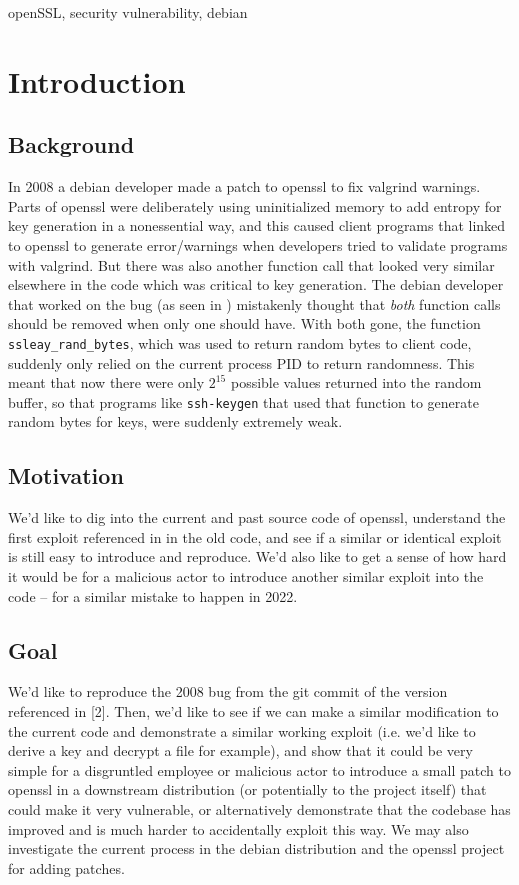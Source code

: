 \documentclass[conference]{IEEEtran}
\begin{document}
\begin{IEEEkeywords}
openSSL, security vulnerability, debian
\end{IEEEkeywords}

\section{Introduction}
\subsection{Background}
In 2008 a debian developer made a patch to openssl to fix valgrind
warnings\cite{2}\cite{3}. Parts of openssl were deliberately using
uninitialized memory to add entropy for key generation in a
nonessential way, and this caused client programs that linked to
openssl to generate error/warnings when developers tried to validate
programs with valgrind. But there was also another function call that
looked very similar elsewhere in the code which was critical to key
generation. The debian developer that worked on the bug (as seen in
\cite{2}) mistakenly thought that \emph{both} function calls should be
removed when only one should have. With both gone, the function
\verb|ssleay_rand_bytes|, which was used to return random bytes to
client code, suddenly only relied on the current process PID to return
randomness. This meant that now there were only $2^{15}$ possible
values returned into the random buffer, so that programs like
\verb|ssh-keygen| that used that function to generate random bytes for
keys, were suddenly extremely weak.

\subsection{Motivation}
We'd like to dig into the current and past source code of openssl,
understand the first exploit referenced in \cite{1} in the old code,
and see if a similar or identical exploit is still easy to introduce
and reproduce. We'd also like to get a sense of how hard it would be
for a malicious actor to introduce another similar exploit into the
code -- for a similar mistake to happen in 2022.

\subsection{Goal}
We'd like to reproduce the 2008 bug from the git commit of the version
referenced in [2]. Then, we'd like to see if we can make a similar
modification to the current code and demonstrate a similar working
exploit (i.e. we'd like to derive a key and decrypt a file for
example), and show that it could be very simple for a disgruntled
employee or malicious actor to introduce a small patch to openssl in a
downstream distribution (or potentially to the project itself) that
could make it very vulnerable, or alternatively demonstrate that the
codebase has improved and is much harder to accidentally exploit this
way. We may also investigate the current process in the debian
distribution and the openssl project for adding patches.
\end{document}
